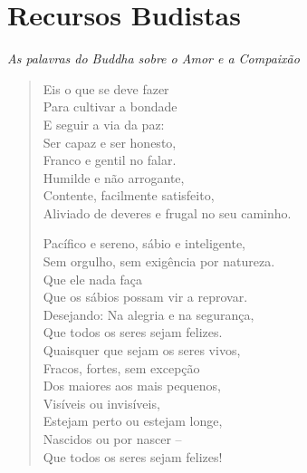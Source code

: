 

\setlength{\chapterTitleTopSkip}{35mm}

\chapter{Recursos Budistas}

\clearpage
{}

\emph{As palavras do Buddha sobre o Amor e a Compaixão}

\begin{verse}

Eis o que se deve fazer\\
Para cultivar a bondade\\
E seguir a via da paz:\\
Ser capaz e ser honesto,\\
Franco e gentil no falar.\\
Humilde e não arrogante,\\
Contente, facilmente satisfeito,\\
Aliviado de deveres e frugal no seu caminho.

Pacífico e sereno, sábio e inteligente,\\
Sem orgulho, sem exigência por natureza.\\
Que ele nada faça\\
Que os sábios possam vir a reprovar.\\
Desejando: Na alegria e na segurança,\\
Que todos os seres sejam felizes.\\
Quaisquer que sejam os seres vivos,\\
Fracos, fortes, sem excepção\\
Dos maiores aos mais pequenos,\\
Visíveis ou invisíveis,\\
Estejam perto ou estejam longe,\\
Nascidos ou por nascer --\\
Que todos os seres sejam felizes!


\end{verse}
